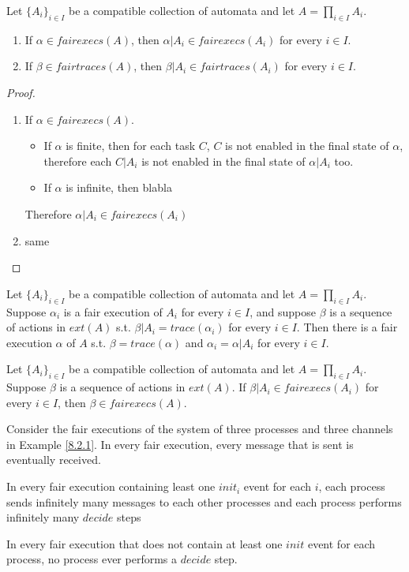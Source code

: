 \documentclass[11pt]{article}
\begin{document}
\begin{theorem}[]
\label{8.4}
Let \(\{A_i\}_{i\in I}\) be a compatible collection of automata and let \(A=\prod_{i\in I}A_i\).
\begin{enumerate}
\item If \(\alpha\in fairexecs(A)\), then \(\alpha|A_i\in fairexecs(A_i)\) for every \(i\in I\).
\item If \(\beta\in fairtraces(A)\), then \(\beta|A_i\in fairtraces(A_i)\) for every \(i\in I\).
\end{enumerate}
\end{theorem}

\begin{proof}
\begin{enumerate}
\item If \(\alpha\in fairexecs(A)\).
\begin{itemize}
\item If \(\alpha\) is finite, then for each task \(C\), \(C\) is not enabled in the final state of
\(\alpha\), therefore each \(C|A_i\) is not enabled in the final state of \(\alpha|A_i\) too.
\item If \(\alpha\) is infinite, then blabla
\end{itemize}
Therefore \(\alpha|A_i\in fairexecs(A_i)\)
\item same
\end{enumerate}
\end{proof}

\begin{theorem}[]
\label{8.5}
Let \(\{A_i\}_{i\in I}\) be a compatible collection of automata and let \(A=\prod_{i\in I}A_i\).
Suppose \(\alpha_i\) is a fair execution of \(A_i\) for every \(i\in I\), and suppose \(\beta\) is a
sequence of actions in \(ext(A)\) s.t. \(\beta|A_i=trace(\alpha_i)\) for every \(i\in I\). Then there
is a fair execution \(\alpha\) of \(A\) s.t. \(\beta=trace(\alpha)\) and \(\alpha_i=\alpha|A_i\) for
every \(i\in I\).
\end{theorem}

\begin{theorem}[]
\label{8.6}
Let \(\{A_i\}_{i\in I}\) be a compatible collection of automata and let \(A=\prod_{i\in I}A_i\).
Suppose \(\beta\) is a sequence of actions in \(ext(A)\). If \(\beta|A_i\in fairexecs(A_i)\)  for
every \(i\in I\), then \(\beta\in fairexecs(A)\).
\end{theorem}

\begin{examplle}[Fairness]
Consider the fair executions of the system of three processes and three channels in Example \ref{8.2.1}.
In every fair execution, every message that is sent is eventually received.

In every fair execution containing least one \(init_i\) event for each \(i\), each process sends
infinitely many messages to each other processes and each process performs infinitely many \(decide\) steps

In every fair execution that does not contain at least one \(init\) event for each process, no process
ever performs a \(decide\) step.
\end{examplle}
\end{document}
